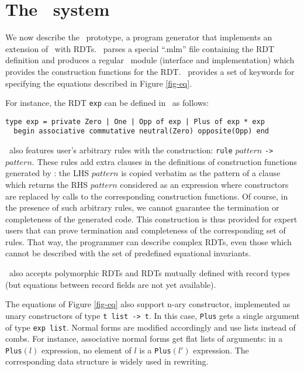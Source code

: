 
\section{The \moca\ system}
\label{sec-moca}

We now describe the \moca\ prototype, a program generator that
implements an extension of \ocaml\ with RDTs. \moca\ parses a special
``.mlm'' file containing the RDT definition and produces a regular
\ocaml\ module (interface and implementation) which provides the
construction functions for the RDT. \moca\ provides a set of keywords
for specifying the equations described in Figure \ref{fig-eq}.

For instance, the RDT {\tt exp} can be defined in \moca\ as follows:

{\small\begin{verbatim}
type exp = private Zero | One | Opp of exp | Plus of exp * exp
  begin associative commutative neutral(Zero) opposite(Opp) end
\end{verbatim}}

\moca\ also features user's arbitrary rules with the construction:
{\small {\tt rule} $pattern$ {\tt ->} $pattern$}. These rules add
extra clauses in the definitions of construction functions generated
by \moca: the LHS $pattern$ is copied verbatim as the pattern of a
clause which returns the RHS $pattern$ considered as an expression
where constructors are replaced by calls to the corresponding
construction functions. Of course, in the presence of such arbitrary
rules, we cannot guarantee the termination or completeness of the
generated code. This construction is thus provided for expert users
that can prove termination and completeness of the corresponding set
of rules. That way, the programmer can describe complex RDTs, even
those which cannot be described with the set of predefined equational
invariants.

\moca\ also accepts polymorphic RDTs and RDTs mutually defined with
record types (but equations between record fields are not yet
available).

The equations of Figure \ref{fig-eq} also support n-ary constructor,
implemented as unary constructors of type {\tt t list -> t}. In this
case, {\tt Plus} gets a single argument of type {\tt exp list}. Normal
forms are modified accordingly and use lists instead of combs. For
instance, associative normal forms get flat lists of arguments: in a
{\tt Plus}$(l)$ expression, no element of $l$ is a {\tt Plus}$(l')$
expression. The corresponding data structure is widely used in
rewriting.


